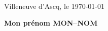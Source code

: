 \documentclass[a4paper,11pt]{article}
\begin{document}

\vspace{1cm}

Villeneuve d'Ascq, le \today

\begin{expediteur}
\textbf{Mon pr\'enom MON--NOM}
\end{expediteur}
\end{document}
